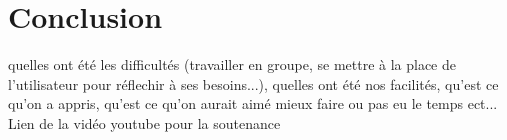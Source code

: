\documentclass[12pt,a4paper]{report}
\begin{document}


\chapter{Conclusion}
quelles ont été les difficultés (travailler en groupe, se mettre à la place de l'utilisateur pour réflechir à ses besoins...), 
quelles ont été nos facilités,
qu'est ce qu'on a appris, 
qu'est ce qu'on aurait aimé mieux faire ou pas eu le temps ect... \\
Lien de la vidéo youtube pour la soutenance

%
\end{document}

